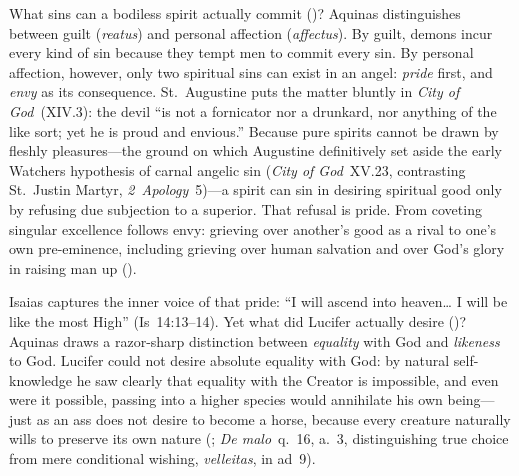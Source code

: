 What sins can a bodiless spirit actually commit ()? Aquinas distinguishes between guilt (\emph{reatus}) and personal affection (\emph{affectus}). By guilt, demons incur every kind of sin because they tempt men to commit every sin. By personal affection, however, only two spiritual sins can exist in an angel: \emph{pride} first, and \emph{envy} as its consequence. St.~Augustine puts the matter bluntly in \emph{City of God}~(XIV.3): the devil ``is not a fornicator nor a drunkard, nor anything of the like sort; yet he is proud and envious.'' Because pure spirits cannot be drawn by fleshly pleasures---the ground on which Augustine definitively set aside the early Watchers hypothesis of carnal angelic sin (\emph{City of God}~XV.23, contrasting St.~Justin Martyr, \emph{2~Apology}~5)---a spirit can sin in desiring spiritual good only by refusing due subjection to a superior. That refusal is pride. From coveting singular excellence follows envy: grieving over another's good as a rival to one's own pre-eminence, including grieving over human salvation and over God's glory in raising man up ().

Isaias captures the inner voice of that pride: ``I will ascend into heaven\dots{} I will be like the most High'' (Is~14:13--14). Yet what did Lucifer actually desire ()? Aquinas draws a razor-sharp distinction between \emph{equality} with God and \emph{likeness} to God. Lucifer could not desire absolute equality with God: by natural self-knowledge he saw clearly that equality with the Creator is impossible, and even were it possible, passing into a higher species would annihilate his own being---just as an ass does not desire to become a horse, because every creature naturally wills to preserve its own nature (; \emph{De malo}~q.~16, a.~3, distinguishing true choice from mere conditional wishing, \emph{velleitas}, in ad~9).

